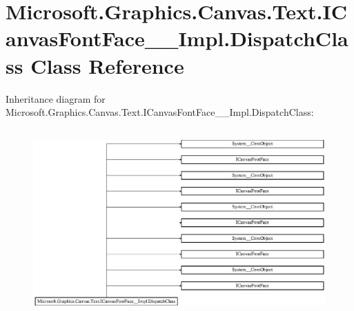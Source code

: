 \hypertarget{class_microsoft_1_1_graphics_1_1_canvas_1_1_text_1_1_i_canvas_font_face_____impl_1_1_dispatch_class}{}\section{Microsoft.\+Graphics.\+Canvas.\+Text.\+I\+Canvas\+Font\+Face\+\_\+\+\_\+\+Impl.\+Dispatch\+Class Class Reference}
\label{class_microsoft_1_1_graphics_1_1_canvas_1_1_text_1_1_i_canvas_font_face_____impl_1_1_dispatch_class}
Inheritance diagram for Microsoft.\+Graphics.\+Canvas.\+Text.\+I\+Canvas\+Font\+Face\+\_\+\+\_\+\+Impl.\+Dispatch\+Class\+:\begin{figure}[H]
\begin{center}
\leavevmode
\includegraphics[height=7.230048cm]{class_microsoft_1_1_graphics_1_1_canvas_1_1_text_1_1_i_canvas_font_face_____impl_1_1_dispatch_class}
\end{center}
\end{figure}
